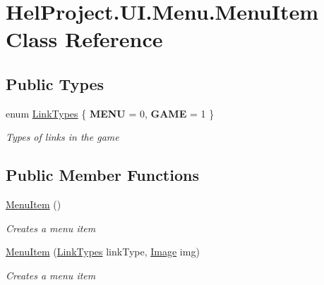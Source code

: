 \hypertarget{class_hel_project_1_1_u_i_1_1_menu_1_1_menu_item}{}\section{Hel\+Project.\+U\+I.\+Menu.\+Menu\+Item Class Reference}
\label{class_hel_project_1_1_u_i_1_1_menu_1_1_menu_item}
\subsection*{Public Types}
\begin{DoxyCompactItemize}
\item 
enum \hyperlink{class_hel_project_1_1_u_i_1_1_menu_1_1_menu_item_aeb422f96ad792622197d81bea826c282}{Link\+Types} \{ {\bfseries M\+E\+N\+U} = 0, 
{\bfseries G\+A\+M\+E} = 1
 \}
\begin{DoxyCompactList}\small\item\em Types of links in the game \end{DoxyCompactList}\end{DoxyCompactItemize}
\subsection*{Public Member Functions}
\begin{DoxyCompactItemize}
\item 
\hyperlink{class_hel_project_1_1_u_i_1_1_menu_1_1_menu_item_abe9a2c0d8a59bfecf5745e21f8dc0642}{Menu\+Item} ()
\begin{DoxyCompactList}\small\item\em Creates a menu item \end{DoxyCompactList}\item 
\hyperlink{class_hel_project_1_1_u_i_1_1_menu_1_1_menu_item_a8baaafaabc305d97e08fac53df14c889}{Menu\+Item} (\hyperlink{class_hel_project_1_1_u_i_1_1_menu_1_1_menu_item_aeb422f96ad792622197d81bea826c282}{Link\+Types} link\+Type, \hyperlink{class_hel_project_1_1_u_i_1_1_image}{Image} img)
\begin{DoxyCompactList}\small\item\em Creates a menu item \end{DoxyCompactList}\end{DoxyCompactItemize}
